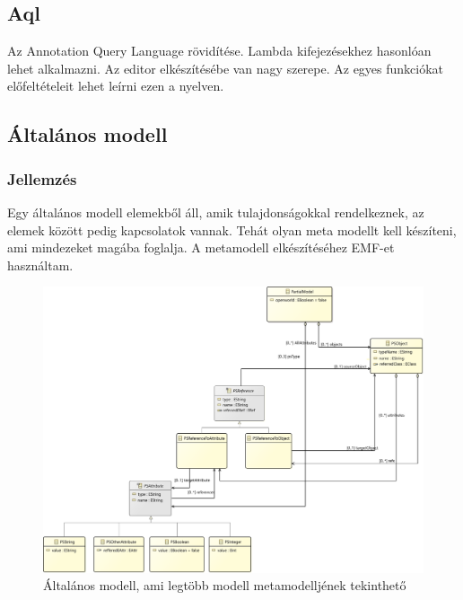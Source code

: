 \subsection{Aql}
\nocite{Acceleo}
\nocite{OCL}
Az Annotation Query Language \cite{Aql} rövidítése. Lambda \cite{Lambda} kifejezésekhez hasonlóan lehet alkalmazni. 
Az editor elkészítésébe van nagy szerepe. Az egyes funkciókat előfeltételeit lehet leírni ezen a nyelven. 


\subsection{Általános modell}

\subsubsection{Jellemzés}
Egy általános modell elemekből áll, amik tulajdonságokkal rendelkeznek, az elemek között pedig kapcsolatok vannak. Tehát olyan meta modellt kell készíteni, ami mindezeket magába foglalja. A metamodell elkészítéséhez EMF-et használtam.

\begin{figure}[!ht]
	\centering
	\includegraphics[width=150mm]{figures/partialmodel01.pdf}
	\caption{Általános modell, ami legtöbb modell metamodelljének tekinthető} 
	\label{model}
\end{figure}

